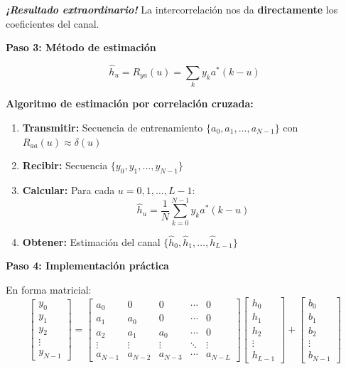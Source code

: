 \documentclass[11pt,a4paper]{article}
\begin{document}
\textit{\textbf{¡Resultado extraordinario!}} La intercorrelaci\'on nos da \textbf{directamente} los coeficientes del canal.

\textbf{Paso 3: M\'etodo de estimaci\'on}

\[
\boxed{\hat{h}_u = R_{ya}(u) = \sum_k y_k a^*(k-u)}
\]

\textbf{Algoritmo de estimaci\'on por correlaci\'on cruzada:}

\begin{enumerate}
    \item \textbf{Transmitir:} Secuencia de entrenamiento $\{a_0, a_1, \ldots, a_{N-1}\}$ con $R_{aa}(u) \approx \delta(u)$
    
    \item \textbf{Recibir:} Secuencia $\{y_0, y_1, \ldots, y_{N-1}\}$
    
    \item \textbf{Calcular:} Para cada $u = 0, 1, \ldots, L-1$:
    \[
    \hat{h}_u = \frac{1}{N} \sum_{k=0}^{N-1} y_k a^*(k-u)
    \]
    
    \item \textbf{Obtener:} Estimaci\'on del canal $\{\hat{h}_0, \hat{h}_1, \ldots, \hat{h}_{L-1}\}$
\end{enumerate}

\textbf{Paso 4: Implementaci\'on pr\'actica}

En forma matricial:
\[
\begin{bmatrix}
y_0 \\
y_1 \\
y_2 \\
\vdots \\
y_{N-1}
\end{bmatrix}
=
\begin{bmatrix}
a_0 & 0 & 0 & \cdots & 0 \\
a_1 & a_0 & 0 & \cdots & 0 \\
a_2 & a_1 & a_0 & \cdots & 0 \\
\vdots & \vdots & \vdots & \ddots & \vdots \\
a_{N-1} & a_{N-2} & a_{N-3} & \cdots & a_{N-L}
\end{bmatrix}
\begin{bmatrix}
h_0 \\
h_1 \\
h_2 \\
\vdots \\
h_{L-1}
\end{bmatrix}
+
\begin{bmatrix}
b_0 \\
b_1 \\
b_2 \\
\vdots \\
b_{N-1}
\end{bmatrix}
\]
\end{document}
